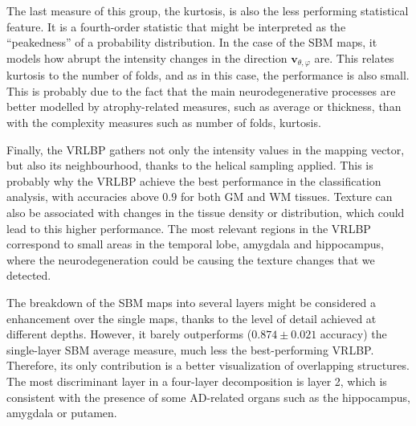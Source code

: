The last measure of this group, the kurtosis, is also the less performing statistical feature. It is a fourth-order statistic that might be interpreted as the ``peakedness'' of a probability distribution. In the case of the \ac{SBM} maps, it models how abrupt the intensity changes in the direction $\mathbf{v}_{\theta,\varphi}$ are. This relates kurtosis to the number of folds, and as in this case, the performance is also small. This is probably due to the fact that the main neurodegenerative processes are better modelled by atrophy-related measures, such as average or thickness, than with the complexity measures such as number of folds, kurtosis. 

Finally, the \ac{VRLBP} gathers not only the intensity values in the mapping vector, but also its neighbourhood, thanks to the helical sampling applied. This is probably why the \ac{VRLBP} achieve the best performance in the classification analysis, with accuracies above $0.9$ for both \ac{GM} and \ac{WM} tissues. Texture can also be associated with changes in the tissue density or distribution, which could lead to this higher performance. The most relevant regions in the \ac{VRLBP} correspond to small areas in the temporal lobe, amygdala and hippocampus, where the neurodegeneration could be causing the texture changes that we detected. 

The breakdown of the \ac{SBM} maps into several layers might be considered a enhancement over the single maps, thanks to the level of detail achieved at different depths. However, it barely outperforms ($0.874 \pm 0.021$ accuracy) the single-layer \ac{SBM} average measure, much less the best-performing \ac{VRLBP}. Therefore, its only contribution is a better visualization of overlapping structures. The most discriminant layer in a four-layer decomposition is layer 2, which is consistent with the presence of some \ac{AD}-related organs such as the hippocampus, amygdala or putamen. 


%
%	


